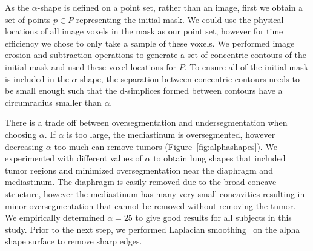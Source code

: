 \documentclass{llncs}
\begin{document}
As the $\alpha$-shape is defined on a point set, rather than an image, first we obtain a set of points $p \in P$ representing the initial mask. We could use the physical locations of all image voxels in the mask as our point set, however for time efficiency we chose to only take a sample of these voxels. We performed image erosion and subtraction operations to generate a set of concentric contours of the initial mask and used these voxel locations for $P$. To ensure all of the initial mask is included in the $\alpha$-shape, the separation between concentric contours needs to be small enough such that the d-simplices formed between contours have a circumradius smaller than $\alpha$. 


There is a trade off between oversegmentation and undersegmentation when choosing $\alpha$. If $\alpha$ is too large, the mediastinum is oversegmented, however decreasing $\alpha$ too much can remove tumors (Figure~\ref{fig:alphashapes}).  We experimented with different values of $\alpha$ to obtain lung shapes that included tumor regions and minimized oversegmentation near the diaphragm and mediastinum. The diaphragm is easily removed due to the broad concave structure, however the mediastinum has many very small concavities resulting in minor oversegmentation that cannot be removed without removing the tumor. We empirically determined $ \alpha=25 $ to give good results for all subjects in this study. Prior to the next step, we performed Laplacian smoothing~\cite{herrmann1976} on the alpha shape surface to remove sharp edges. 
\end{document}

